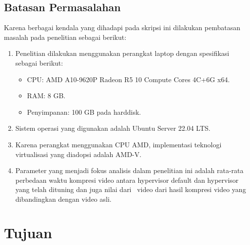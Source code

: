 \subsection{Batasan Permasalahan}
Karena berbagai kendala yang dihadapi pada skripsi ini dilakukan pembatasan masalah pada penelitian  sebagai berikut:
\begin{enumerate}
  \item Penelitian dilakukan menggunakan perangkat laptop dengan spesifikasi sebagai berikut:
  \begin{itemize}
    \item CPU: AMD A10-9620P Radeon R5 10 Compute Cores 4C+6G x64.
	\item RAM: 8 GB.
	\item Penyimpanan: 100 GB pada harddisk.
 \end{itemize}
  \item Sistem operasi yang digunakan adalah Ubuntu Server 22.04 LTS.
  \item Karena perangkat menggunakan CPU AMD, implementasi teknologi virtualisasi yang diadopsi adalah AMD-V.
  \item Parameter yang menjadi fokus analisis dalam penelitian ini adalah rata-rata perbedaan waktu kompresi video antara hypervisor default dan hypervisor yang telah dituning dan juga nilai dari \ssim\ video dari hasil kompresi video yang dibandingkan dengan video asli.
\end{enumerate}


\section{Tujuan}

